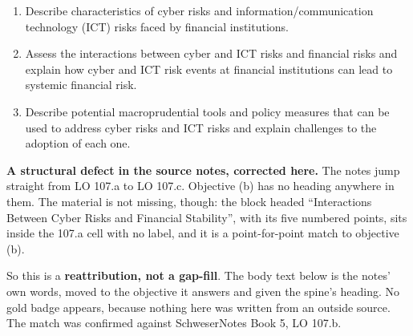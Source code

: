 
\begin{cikeybox}[title={The three objectives, in the spine's own words}]
\begin{enumerate}[label=\textbf{\alph*.}]
\item Describe characteristics of cyber risks and information/communication technology (ICT)
risks faced by financial institutions.
\item Assess the interactions between cyber and ICT risks and financial risks and explain how
cyber and ICT risk events at financial institutions can lead to systemic financial risk.
\item Describe potential macroprudential tools and policy measures that can be used to address
cyber risks and ICT risks and explain challenges to the adoption of each one.
\end{enumerate}
\end{cikeybox}

\begin{cisrcbox}
{\sffamily\bfseries\color{FRMNavy}A structural defect in the source notes, corrected here.}
The notes jump straight from LO 107.a to LO 107.c. Objective (b) has no heading anywhere in
them. The material is not missing, though: the block headed ``Interactions Between Cyber Risks
and Financial Stability'', with its five numbered points, sits inside the 107.a cell with no
label, and it is a point-for-point match to objective (b).\par\vspace{4pt}
So this is a \textbf{reattribution, not a gap-fill}. The body text below is the notes' own
words, moved to the objective it answers and given the spine's heading. No gold badge appears,
because nothing here was written from an outside source. The match was confirmed against
SchweserNotes Book 5, LO 107.b.
\end{cisrcbox}


